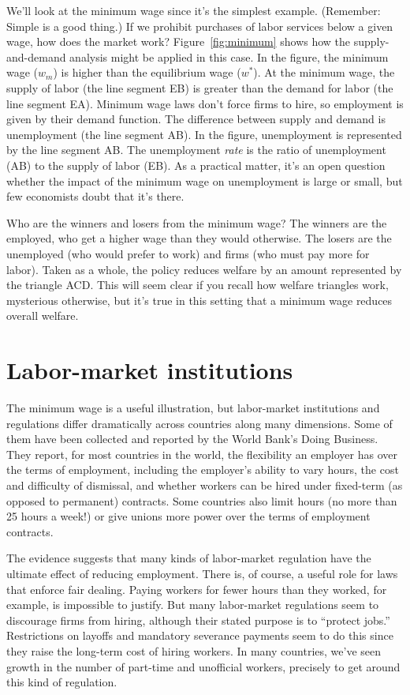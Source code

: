 We'll look at the minimum wage since it's the simplest example.
(Remember:  Simple is a good thing.)
If we prohibit purchases of labor services below a given wage,
how does the market work?
Figure~\ref{fig:minimum} shows how the supply-and-demand analysis
might be applied in this case.  In the figure, the minimum wage
($w_{m}$) is higher than the equilibrium wage ($w^{*}$).
At the minimum wage, the supply of labor
(the line segment EB) is greater than the demand for labor
(the line segment EA).
Minimum wage laws don't force firms to hire,
so employment is given by their demand function.
The difference between supply and demand is
unemployment (the line segment AB).
In the figure, unemployment is represented by the line segment AB.
The unemployment {\it rate\/} is the ratio of unemployment (AB)
to the supply of labor (EB).
As a practical matter, it's an open question whether the impact of the
minimum wage on unemployment is large or small, but few economists
doubt that it's there.


Who are the winners and losers from the minimum wage?
The winners are the employed,
who get a higher wage than they would otherwise.
The losers are the unemployed (who would prefer to work)
and firms (who must pay more for labor).
Taken as a whole, the policy reduces welfare by an amount
represented by the triangle ACD.
This will seem clear if you recall how welfare triangles work,
mysterious otherwise,
but it's true in this setting that a minimum wage reduces overall welfare.


\section{Labor-market institutions}

The minimum wage is a useful illustration,
but labor-market institutions and regulations
differ dramatically across countries along many dimensions.
Some of them have been collected and reported by the
World Bank's Doing Business.
They report, for most countries in the world,
the flexibility an employer has over the terms of employment,
including the employer's ability to vary hours,
the cost and difficulty of dismissal,
and whether workers can be hired under fixed-term (as opposed to permanent)
contracts.
Some countries also limit hours (no more than 25 hours a week!)
or give unions more power over the terms of employment contracts.


The evidence suggests that many kinds of labor-market regulation
have the ultimate effect of reducing employment.
There is, of course, a useful role for laws that enforce fair dealing.
Paying workers for fewer hours than they worked,
for example, is impossible to justify.
But many labor-market regulations seem to discourage firms from hiring,
although their stated purpose is to ``protect jobs.''
Restrictions on layoffs and mandatory severance payments
seem to do this since they raise the long-term cost
of hiring workers.
In many countries, we've seen growth in the number of part-time and unofficial
workers, precisely to get around this kind of regulation.


